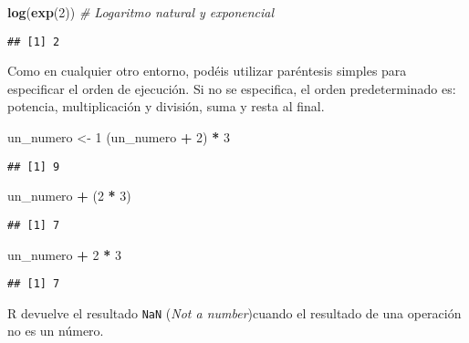 \documentclass[
]{book}
\newenvironment{Shaded}{\begin{snugshade}}{\end{snugshade}}
\newcommand{\CommentTok}[1]{\textcolor[rgb]{0.56,0.35,0.01}{\textit{#1}}}
\newcommand{\DecValTok}[1]{\textcolor[rgb]{0.00,0.00,0.81}{#1}}
\newcommand{\KeywordTok}[1]{\textcolor[rgb]{0.13,0.29,0.53}{\textbf{#1}}}
\newcommand{\NormalTok}[1]{#1}
\newcommand{\OperatorTok}[1]{\textcolor[rgb]{0.81,0.36,0.00}{\textbf{#1}}}
\newcommand{\StringTok}[1]{\textcolor[rgb]{0.31,0.60,0.02}{#1}}
\begin{document}
\begin{Shaded}
\begin{Highlighting}[]
\KeywordTok{log}\NormalTok{(}\KeywordTok{exp}\NormalTok{(}\DecValTok{2}\NormalTok{)) }\CommentTok{# Logaritmo natural y exponencial}
\end{Highlighting}
\end{Shaded}

\begin{verbatim}
## [1] 2
\end{verbatim}

Como en cualquier otro entorno, podéis utilizar paréntesis simples para especificar el orden de ejecución. Si no se especifica, el orden predeterminado es: potencia, multiplicación y división, suma y resta al final.

\begin{Shaded}
\begin{Highlighting}[]
\NormalTok{un_numero <-}\StringTok{ }\DecValTok{1}
\NormalTok{(un_numero }\OperatorTok{+}\StringTok{ }\DecValTok{2}\NormalTok{) }\OperatorTok{*}\StringTok{ }\DecValTok{3}
\end{Highlighting}
\end{Shaded}

\begin{verbatim}
## [1] 9
\end{verbatim}

\begin{Shaded}
\begin{Highlighting}[]
\NormalTok{un_numero }\OperatorTok{+}\StringTok{ }\NormalTok{(}\DecValTok{2} \OperatorTok{*}\StringTok{ }\DecValTok{3}\NormalTok{)}
\end{Highlighting}
\end{Shaded}

\begin{verbatim}
## [1] 7
\end{verbatim}

\begin{Shaded}
\begin{Highlighting}[]
\NormalTok{un_numero }\OperatorTok{+}\StringTok{ }\DecValTok{2} \OperatorTok{*}\StringTok{ }\DecValTok{3}
\end{Highlighting}
\end{Shaded}

\begin{verbatim}
## [1] 7
\end{verbatim}

R devuelve el resultado \texttt{NaN} (\emph{Not a number})cuando el resultado de una operación no es un número.
\end{document}
